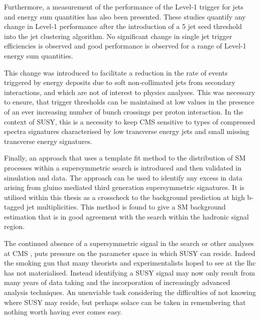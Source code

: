 Furthermore, a measurement of the performance of the Level-1 trigger for jets and energy sum quantities has also been presented. These studies quantify any change in Level-1 performance after the introduction of a 5 \GeV jet seed threshold into the jet clustering algorithm.  No significant change in single jet trigger efficiencies is observed and good performance is observed for a range of Level-1 energy sum quantities.

This change was introduced to facilitate a reduction in the rate of events triggered by energy deposits due to soft non-collimated jets from secondary interactions, and which are not of interest to physics analyses. This was necessary to ensure, that trigger thresholds can be maintained at low values in the presence of an ever increasing number of bunch crossings per proton interaction. In the context of \ac{SUSY}, this is a necessity to keep \ac{CMS} sensitive to types of compressed spectra signatures characterised by low transverse energy jets and small missing transverse energy signatures.

Finally, an approach that uses a template fit method to the \nbreco distribution of \ac{SM} processes within a supersymmetric search is introduced and then validated in simulation and data. The approach can be used to identify any excess in data arising from gluino mediated third generation supersymmetric signatures. It is utilised within this thesis as a crosscheck to the \alphat background prediction at high b-tagged jet multiplicities. This method is found to give a \ac{SM} background estimation that is in good agreement with the \alphat search within the hadronic signal region.

The continued absence of a supersymmetric signal in the \alphat search or other analyses at \ac{CMS} \cite{Chatrchyan:2014lfa}\cite{Chatrchyan:2013fea}\cite{Chatrchyan:2013iqa}, puts pressure on the parameter space in which \ac{SUSY} can reside. Indeed the smoking gun that many theorists and experimentalists hoped to see at the \ac{lhc} has not materialised. Instead identifying a \ac{SUSY} signal may now only result from many years of data taking and the incorporation of increasingly advanced analysis techniques. An unenviable task considering the difficulties of not knowing where \ac{SUSY} may reside, but perhaps solace can be taken in remembering that nothing worth having ever comes easy.

\phantom{}
